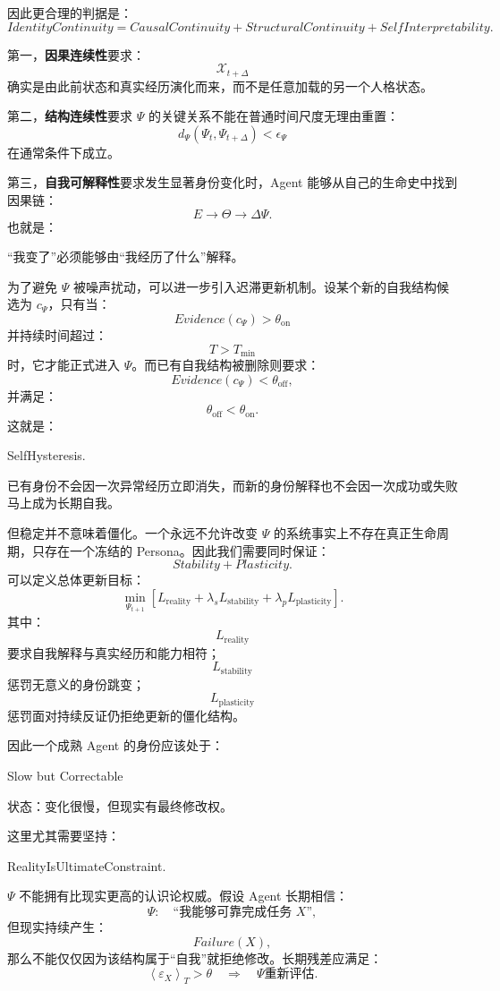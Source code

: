 因此更合理的判据是：
\[
\boxed{
IdentityContinuity
=
CausalContinuity
+
StructuralContinuity
+
SelfInterpretability.
}
\]

第一，\textbf{因果连续性}要求：
\[
\mathcal X_{t+\Delta}
\]
确实是由此前状态和真实经历演化而来，而不是任意加载的另一个人格状态。

第二，\textbf{结构连续性}要求 $\Psi$ 的关键关系不能在普通时间尺度无理由重置：
\[
d_\Psi
\left(
\Psi_t,
\Psi_{t+\Delta}
\right)
<
\epsilon_\Psi
\]
在通常条件下成立。

第三，\textbf{自我可解释性}要求发生显著身份变化时，Agent 能够从自己的生命史中找到因果链：
\[
E
\rightarrow
\Theta
\rightarrow
\Delta\Psi.
\]
也就是：
\begin{statementbox}
“我变了”必须能够由“我经历了什么”解释。
\end{statementbox}

为了避免 $\Psi$ 被噪声扰动，可以进一步引入迟滞更新机制。设某个新的自我结构候选为 $c_\Psi$，只有当：
\[
Evidence(c_\Psi)
>
\theta_{\mathrm{on}}
\]
并持续时间超过：
\[
T>T_{\min}
\]
时，它才能正式进入 $\Psi$。而已有自我结构被删除则要求：
\[
Evidence(c_\Psi)
<
\theta_{\mathrm{off}},
\]
并满足：
\[
\theta_{\mathrm{off}}
<
\theta_{\mathrm{on}}.
\]
这就是：
\begin{statementbox}
SelfHysteresis.
\end{statementbox}
已有身份不会因一次异常经历立即消失，而新的身份解释也不会因一次成功或失败马上成为长期自我。

但稳定并不意味着僵化。一个永远不允许改变 $\Psi$ 的系统事实上不存在真正生命周期，只存在一个冻结的 Persona。因此我们需要同时保证：
\[
\boxed{
Stability
+
Plasticity.
}
\]
可以定义总体更新目标：
\[
\min_{\Psi_{t+1}}
\left[
L_{\mathrm{reality}}
+
\lambda_s L_{\mathrm{stability}}
+
\lambda_p L_{\mathrm{plasticity}}
\right].
\]
其中：
\[
L_{\mathrm{reality}}
\]
要求自我解释与真实经历和能力相符；
\[
L_{\mathrm{stability}}
\]
惩罚无意义的身份跳变；
\[
L_{\mathrm{plasticity}}
\]
惩罚面对持续反证仍拒绝更新的僵化结构。

因此一个成熟 Agent 的身份应该处于：
\begin{statementbox}
Slow but Correctable
\end{statementbox}
状态：变化很慢，但现实有最终修改权。

这里尤其需要坚持：
\begin{statementbox}
RealityIsUltimateConstraint.
\end{statementbox}
$\Psi$ 不能拥有比现实更高的认识论权威。假设 Agent 长期相信：
\[
\Psi:
\quad
\text{“我能够可靠完成任务 $X$”},
\]
但现实持续产生：
\[
Failure(X),
\]
那么不能仅仅因为该结构属于“自我”就拒绝修改。长期残差应满足：
\[
\left\langle
\varepsilon_X
\right\rangle_T
>
\theta
\quad\Longrightarrow\quad
\Psi\text{重新评估}.
\]


